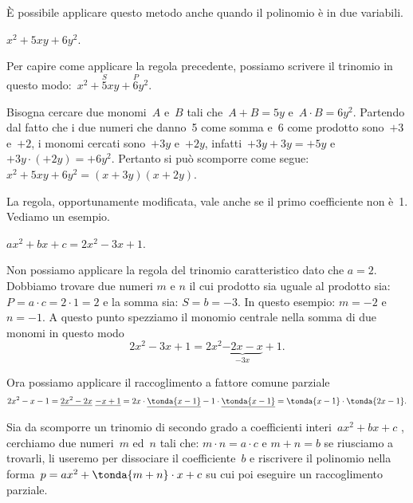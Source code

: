 
È possibile applicare questo metodo anche quando il
polinomio è in due variabili.

 \begin{esempio}
 \(x^2+5xy+6y^{2}\).

 Per capire come applicare la regola precedente, possiamo scrivere il
trinomio in questo modo:~\(x^2+\overset{S}{5}xy+\overset{P}{6}y{^{2}}\).

Bisogna cercare due monomi~\(A\) e~\(B\) tali che~\(A+B=5y\)
e~\(A\cdot B=6y^{2}\). Partendo dal fatto che i due numeri che danno~5
come somma e~6 come prodotto sono~\(+3\) e~\(+2\), i monomi cercati 
sono~\(+3y\) e~\(+2y\), infatti~\(+3y+3y=+5y\) e~\(+3y\cdot (+2y)=+6y^{2}\). 
Pertanto si può scomporre come segue:~\(x^2+5xy+6y^{2}=(x+3y)(x+2y)\).
 \end{esempio}

La regola, opportunamente modificata, vale anche se il primo
coefficiente non è~1. Vediamo un esempio.

 \begin{esempio}
 \(ax^2+bx+c=2x^2-3x+1\).

Non possiamo applicare la regola del trinomio caratteristico dato che 
\(a=2\).
Dobbiamo trovare due numeri \(m\) e \(n\) il cui prodotto sia uguale al 
prodotto sia: \(P = a \cdot c = 2 \cdot 1 = 2\)
e la somma sia: \(S = b = -3\).
In questo esempio: \(m = -2\) e \(n = -1\).
A questo punto spezziamo il monomio centrale nella somma di due monomi in 
questo modo
\[2x^2-3x+1=2x^2\underbrace{-2x-x}_{-3x}+1.\]

Ora possiamo applicare il raccoglimento a fattore comune parziale
\[2x^2-x-1=
\underline{2x^2-2x}~\underline{-x+1}=
2x \cdot \underline{\tonda{x-1}}-1 \cdot \underline{\tonda{x-1}}=
\tonda{x-1}\cdot \tonda{2x-1}.\]
 \end{esempio}

\begin{procedura}
Sia da scomporre un trinomio di secondo grado a coefficienti 
interi~\(ax^2+bx+c\)
, cerchiamo due numeri~\(m\) ed~\(n\) tali che: \quad 
\(m \cdot n = a \cdot c\) \quad 
e \quad 
\(m+n=b\)  \quad
se riusciamo a trovarli, li useremo per dissociare
il coefficiente~\(b\) e riscrivere il polinomio nella 
forma~\(p=ax^2+\tonda{m+n}\cdot x+c\)
su cui poi eseguire un raccoglimento parziale.
\end{procedura}

